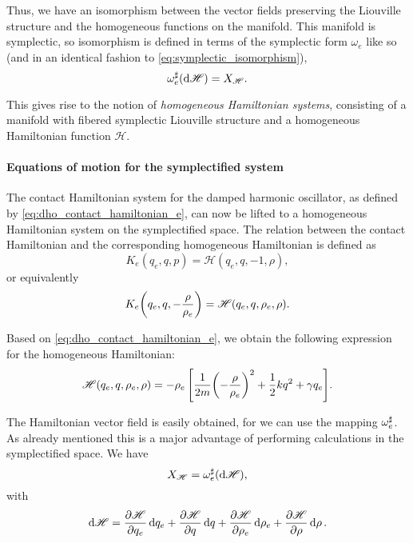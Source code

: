 Thus, we have an isomorphism between the vector fields preserving the Liouville structure and the homogeneous functions on the manifold. 
This manifold is symplectic, so isomorphism is defined in terms of the symplectic form \(\omega_e\) like so (and in an identical fashion to \cref{eq:symplectic_isomorphism}),
\begin{equation}
     \omega_e^\sharp(\dd{\mathscr{H}}) = X_\mathscr{H}.
\end{equation}

This gives rise to the notion of \emph{homogeneous Hamiltonian systems}, consisting of a manifold with fibered symplectic Liouville structure and a homogeneous Hamiltonian function \(\mathscr{H}\).

\paragraph{Equations of motion for the symplectified system} The contact Hamiltonian system for the damped harmonic oscillator, as defined by \cref{eq:dho_contact_hamiltonian_e}, can now be lifted to a homogeneous Hamiltonian system on the symplectified space. The relation between the contact Hamiltonian and the corresponding homogeneous Hamiltonian is defined as \cite{VanderSchaft2021a,Libermann1987,Arnold1989}
\begin{equation}
     K_e(q_e, q, p) = \mathscr{H}(q_e, q, -1, \rho),
\end{equation}
or equivalently
\begin{equation}
    K_e\qty(q_e, q, -\frac{\rho}{\rho_e}) = \mathscr{H}(q_e, q, \rho_e, \rho). 
    \label{eq:H_contact_homo}
\end{equation}

Based on \cref{eq:dho_contact_hamiltonian_e}, we obtain the following expression for the homogeneous Hamiltonian:
\begin{equation}
    \mathscr{H}(q_e, q, \rho_e, \rho) = -\rho_e\,\qty[\frac{1}{2m}\qty(-\frac{\rho}{\rho_e})^2 + \frac{1}{2}kq^2 + \gamma q_e]. 
    \label{eq:H_dho_homo}
\end{equation}

The Hamiltonian vector field is easily obtained, for we can use the mapping \(\omega_e^\sharp\). As already mentioned this is a major advantage of performing calculations in the symplectified space. We have
\begin{equation}
     X_\mathscr{H} = \omega_e^\sharp(\dd{\mathscr{H}}),
\end{equation} 
with
\begin{equation}
     \dd{\mathscr{H}} = \pdv{\mathscr{H}}{q_e}\dd{q_e} 
                      + \pdv{\mathscr{H}}{q}\dd{q}
                      + \pdv{\mathscr{H}}{\rho_e}\dd{\rho_e}
                      + \pdv{\mathscr{H}}{\rho}\dd{\rho}.
\end{equation}


